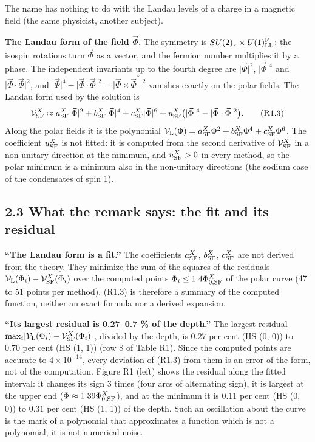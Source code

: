 \documentclass[
  10pt,
]{article}
\begin{document}
The name has nothing to do with the Landau levels of a charge in a
magnetic field (the same physicist, another subject).

\textbf{The Landau form of the field \(\vec\Phi\).} The symmetry is
\(SU(2)_{\rm v}\times U(1)^{\rm F}_{\rm LL}\): the isospin rotations
turn \(\vec\Phi\) as a vector, and the fermion number multiplies it by a
phase. The independent invariants up to the fourth degree are
\(\lvert\vec\Phi\rvert^2\), \(\lvert\vec\Phi\rvert^4\) and
\(\lvert\vec\Phi\cdot\vec\Phi\rvert^2\), and
\(\lvert\vec\Phi\rvert^4-\lvert\vec\Phi\cdot\vec\Phi\rvert^2=\lvert\vec\Phi\times\vec\Phi^*\rvert^2\)
vanishes exactly on the polar fields. The Landau form used by the
solution is
\[\mathcal V^X_{\rm SF}\approx a^X_{\rm SF}\lvert\vec\Phi\rvert^2+b^X_{\rm SF}\lvert\vec\Phi\rvert^4+c^X_{\rm SF}\lvert\vec\Phi\rvert^6+u^X_{\rm SF}\big(\lvert\vec\Phi\rvert^4-\lvert\vec\Phi\cdot\vec\Phi\rvert^2\big).\tag{R1.3}\]
Along the polar fields it is the polynomial
\(\mathcal V_{\rm L}(\Phi)=a^X_{\rm SF}\Phi^2+b^X_{\rm SF}\Phi^4+c^X_{\rm SF}\Phi^6\).
The coefficient \(u^X_{\rm SF}\) is not fitted: it is computed from the
second derivative of \(\mathcal V^X_{\rm SF}\) in a non-unitary
direction at the minimum, and \(u^X_{\rm SF}>0\) in every method, so the
polar minimum is a minimum also in the non-unitary directions (the
sodium case of the condensates of spin 1).

\hypertarget{what-the-remark-says-the-fit-and-its-residual}{%
\subsection{2.3 What the remark says: the fit and its
residual}\label{what-the-remark-says-the-fit-and-its-residual}}

\textbf{``The Landau form is a fit.''} The coefficients
\(a^X_{\rm SF}\), \(b^X_{\rm SF}\), \(c^X_{\rm SF}\) are not derived
from the theory. They minimize the sum of the squares of the residuals
\(\mathcal V_{\rm L}(\Phi_i)-\mathcal V^X_{\rm SF}(\Phi_i)\) over the
computed points \(\Phi_i\le1.4\Phi^X_{0,{\rm SF}}\) of the polar curve
(47 to 51 points per method). (R1.3) is therefore a summary of the
computed function, neither an exact formula nor a derived expansion.

\textbf{``Its largest residual is 0.27--0.7 \% of the depth.''} The
largest residual
\(\max_i\lvert\mathcal V_{\rm L}(\Phi_i)-\mathcal V^X_{\rm SF}(\Phi_i)\rvert\),
divided by the depth, is \(0.27\) per cent (HS (0, 0)) to \(0.70\) per
cent (HS (1, 1)) (row 8 of Table R1). Since the computed points are
accurate to \(4\times10^{-14}\), every deviation of (R1.3) from them is
an error of the form, not of the computation. Figure R1 (left) shows the
residual along the fitted interval: it changes its sign \(3\) times
(four arcs of alternating sign), it is largest at the upper end
(\(\Phi\approx1.39\Phi^X_{0,{\rm SF}}\)), and at the minimum it is
\(0.11\) per cent (HS (0, 0)) to \(0.31\) per cent (HS (1, 1)) of the
depth. Such an oscillation about the curve is the mark of a polynomial
that approximates a function which is not a polynomial; it is not
numerical noise.
\end{document}
